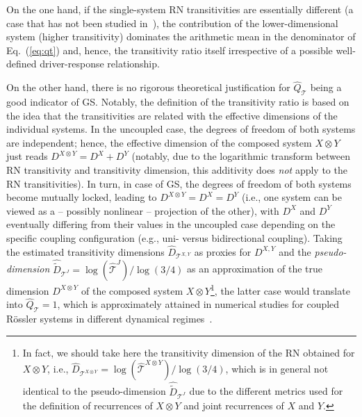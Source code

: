 On the one hand, if the single-system RN transitivities are essentially different (a case that has not been studied in~\cite{Feldhoff2013}), the contribution of the lower-dimensional system (higher transitivity) dominates the arithmetic mean in the denominator of Eq.~(\ref{eq:qt}) and, hence, the transitivity ratio itself irrespective of a possible well-defined driver-response relationship. 

On the other hand, there is no rigorous theoretical justification for $\hat{Q}_{\mathcal{T}}$ being a good indicator of GS. Notably, the definition of the transitivity ratio is based on the idea that the transitivities are related with the effective dimensions of the individual systems. In the uncoupled case, the degrees of freedom of both systems are independent; hence, the effective dimension of the composed system $X\otimes Y$ just reads $D^{X\otimes Y}=D^X + D^Y$ (notably, due to the logarithmic transform between RN transitivity and transitivity dimension, this additivity does \emph{not} apply to the RN transitivities). In turn, in case of GS, the degrees of freedom of both systems become mutually locked, leading to $D^{X\otimes Y}=D^X=D^Y$ (i.e., one system can be viewed as a -- possibly nonlinear -- projection of the other), with $D^X$ and $D^Y$ eventually differing from their values in the uncoupled case depending on the specific coupling configuration (e.g., uni- versus bidirectional coupling). 
Taking the estimated transitivity dimensions $\hat{D}_{\mathcal{T}^{X,Y}}$ as proxies for $D^{X,Y}$ and the \emph{pseudo-dimension} $\hat{\tilde{D}}_{\mathcal{T}^J}=\log(\hat{\mathcal{T}}^J)/\log(3/4)$ as an approximation of the true dimension $D^{X\otimes Y}$ of the composed system $X\otimes Y$\footnote{In fact, we should take here the transitivity dimension of the RN obtained for $X\otimes Y$, i.e., $\hat{D}_{\mathcal{T}^{X\otimes Y}}=\log(\hat{\mathcal{T}}^{X\otimes Y})/\log(3/4)$, which is in general not identical to the pseudo-dimension $\hat{\tilde{D}}_{\mathcal{T}^J}$ due to the different metrics used for the definition of recurrences of $X\otimes Y$ and joint recurrences of $X$ and $Y$.}, the latter case would translate into $\hat{Q}_{\mathcal{T}}=1$, which is approximately attained in numerical studies for coupled R\"ossler systems in different dynamical regimes~\cite{Feldhoff2013}.

